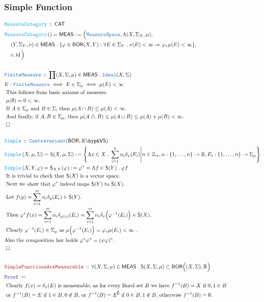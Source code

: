 \documentclass[12pt]{scrartcl}
\newcommand{\TYPE}[1]{\textcolor{NavyBlue}{\mathtt{#1}}}
\newcommand{\FUNC}[1]{\textcolor{Cerulean}{\mathtt{#1}}}
\newcommand{\LOGIC}[1]{\textcolor{Blue}{\mathtt{#1}}}
\newcommand{\THM}[1]{\textcolor{Maroon}{\mathtt{#1}}}
\renewcommand{\.}{\; . \;}
\newcommand{\de}{: \kern 0.1pc =}
\newcommand{\Act}[1]{\left( #1 \right)}
\newcommand{\Theorem}[2]{& \THM{#1} \, :: \, #2 \\ & \Proof = \\ }
\newcommand{\DeclareType}[2]{& \TYPE{#1} \, :: \, #2 \\}
\newcommand{\DefineNamedType}[4]{& #1 : \TYPE{#2} \iff #3 \iff #4 \\}
\newcommand{\DeclareFunc}[2]{& \FUNC{#1} \, :: \, #2 \\}
\newcommand{\DefineNamedFunc}[4]{&  \FUNC{#1}\Act{#2} = #3 \de #4 \\}
\newcommand{\NewLine}{\\ & \kern 1pc}
\newcommand{\Page}[1]{ \begin{align*} #1 \end{align*}   }
\newcommand{\Imply}{\Rightarrow}
\newcommand{\Int}{\mathbb{Z} }
\newcommand{\Reals}{\mathbb{R} }
\DeclareMathOperator*{\id}{id}
\newcommand{\du}{\; \triangle \;}
\renewcommand{\c}{\complement}
\newcommand{\QED}{\; \square}
\newcommand{\EndProof}{& \QED \\}
\newcommand{\Proof}{\LOGIC{Proof} \; }
\newcommand{\Explain}[1]{& \text{#1.} \\}
\newcommand{\ExplainFurther}[1]{& \text{#1} \\}
\newcommand{\Ideal}{\TYPE{Ideal}}
\newcommand{\Contra}{\TYPE{Contravariant}}
\newcommand{\CAT}{\mathsf{CAT}}
\newcommand{\BOR}{\mathsf{BOR}}
\newcommand{\VS}[1]{#1\hyph\mathsf{VS}} %
\newcommand{\MS}{\TYPE{MeasureSpace}}
\newcommand{\MEAS}{\mathsf{MEAS}}
\newcommand{\Simple}{\mathsf{S}}
\begin{document}
\subsubsection{Simple Function}
\Page{
	\DeclareFunc{MeasureCategory}{\CAT}
	\DefineNamedFunc{MeasureCategory}{}{\MEAS}
	{
		\Big(\MS,
			\Lambda (X,\Sigma_X,\mu), \NewLine
			(Y,\Sigma_Y,\nu) \in \MEAS \.  
				\{ \varphi \in \BOR(X,Y) : 
					\forall E \in \Sigma_Y \. 
					\nu(E) < \infty \Imply \varphi_*\mu(E) < \infty
			 \}, \NewLine
			\circ,\id\Big)
		}
	\\
	\DeclareType{FiniteMeasure}{\prod (X,\Sigma,\mu) \in \MEAS \. \Ideal(X,\Sigma)}
	\DefineNamedType{E}{FiniteMeasure}{E \in \Sigma_\mu}{\mu(E) < \infty}
	\Explain{ This follows from basic axioms of measure}
	\Explain{ $\mu(\emptyset) = 0 < \infty $}
	\Explain{ If $A \in \Sigma_\mu$ and $B \in \Sigma$, then   
		$\mu(A \cap B) \le \mu(A) < \infty$}
	\Explain{ And finally, if $A,B \in \Sigma_\mu$, then
			$\mu(A \du B) \le \mu(A \cup B) \le \mu(A) + \mu(B) < \infty$}
	\EndProof	
	\\
	\DeclareFunc{Simple}{\Contra(\BOR,\VS{\Reals})}
	\DefineNamedFunc{Simple}{X,\mu,\Sigma}{\Simple(X,\mu,\Sigma)}
	{
		\left\{ \Lambda x \in X \. \sum^n_{i=1} \alpha_i \delta_x(E_i) 
			\Bigg| 
				n \in \Int_+ , 
				\alpha : \{1,\ldots,n\} \to \Reals, 
				E_i : \{1,\ldots,n\} \to \Sigma_\mu                
		\right\}
	}
	\DefineNamedFunc{Simple}{X,Y,\varphi}{\Simple_{X,Y}(\varphi)}
	{
		\varphi^* = \Lambda f \in \Simple(Y) \.    \varphi f	
	}
	\Explain{ It is trivial to check that $\Simple(X)$ is a vector space}
	\Explain{ Next we show that $\varphi^*$ indeed maps $\Simple(Y)$ to $\Simple(X)$}
	\Explain{ Let $f(y) = \sum^m_{i=1} \alpha_i \delta_y(E_i) \in \Simple(Y)$}
	\Explain{ Then $ \varphi^* f(x) = 
		\sum^m_{i=1} \alpha_i \delta_{\varphi(x)} (E_i) =
		\sum^m_{i=1} \alpha_i \delta_x\Big( \varphi^{-1} (E_i)\Big) \in \Simple(X) $}
	\Explain{ Clearly $\varphi^{-1}(E_i) \in \Sigma_\mu$ as 
		$\mu\Big( \varphi^{-1}(E_i) \Big) =  \varphi_*  \mu(E_i) < \infty  $	
	}
	\Explain{Also the composition law holds $\varphi^* \psi^* = (\psi\varphi)^*$}
	\EndProof
	\\
	\Theorem{SimpleFunctionsAreMeasurable}
	{
		\forall (X,\Sigma,\mu) \in \MEAS \.
		\Simple (X,\Sigma,\mu) \subset \BOR\Big((X,\Sigma),\Reals\Big)
	}
	\ExplainFurther{
		Clearly $f(x) = \delta_x(E)$ is measurable,
	 	as for every Borel set $B$ we have $f^{-1}(B) = X $ if $0,1 \in B$} 
	\Explain{
	 	or $f^{-1}(B) = E$ if   $1\in B,0 \not \in B$,
		or $f^{-1}(B) = E^\c$	if  $0 \in B,1 \not \in B$, otherwise $f^{-1}(B) = \emptyset$}
}
\end{document}
